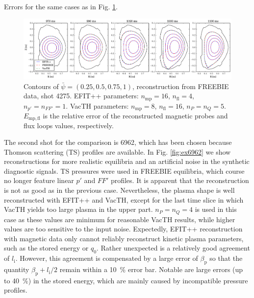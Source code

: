\begin{table}
\caption{Errors for the same cases as in Fig. \ref{fig:ex4275}.}
\label{table:ex4275}
\end{table}

\begin{figure}
\centering   %
\hfill{}
\includegraphics[width=18cm]{figures/example_4275.pdf}
\hfill{}
\caption{Contours of $\bar\psi=\left(0.25,0.5,0.75,1\right)$, reconstruction from FREEBIE data, shot 4275. EFIT++ parameters: $n_\mathrm{mp} = 16$, $n_\mathrm{fl} = 4$, $n_{p'} = n_{FF'} = 1$. VacTH parameters: $n_\mathrm{mp} = 8$, $n_\mathrm{fl} = 16$, $n_P = n_Q = 5$. $E_\mathrm{mp, fl}$ is the relative error of the reconstructed magnetic probes and flux loops values, respectively.}
\label{fig:ex4275}
\end{figure}


The second shot for the comparison is 6962, which has been chosen because Thomson scattering (TS) profiles are available. In Fig. \ref{fig:ex6962} we show reconstructions for more realistic equilibria and an artificial noise in the synthetic diagnostic signals. TS pressures were used in FREEBIE equilibria, which course no longer feature linear $p'$ and $FF'$ profiles. 
It is apparent that the reconstruction is not as good as in the previous case. Nevertheless, the plasma shape is well reconstructed with EFIT++ and VacTH, except for the last time slice in which VacTH yields too large plasma in the upper part.
$n_P = n_Q = 4$ is used in this case as these values are minimum for reasonable VacTH results, while higher values are too sensitive to the input noise.
Expectedly, EFIT++ reconstruction with magnetic data only cannot reliably reconstruct kinetic plasma parameters, such as the stored energy or $q_0$. Rather unexpected is a relatively good agreement of $l_\mathrm{i}$. However, this agreement is compensated by a large error of $\beta_{\mathrm p}$ so that the quantity $\beta_{\mathrm p} + l_{\mathrm i}/2$ remain within a 10~\% error bar. Notable are large errors (up to 40~\%) in the stored energy, which are mainly caused by incompatible pressure profiles.

